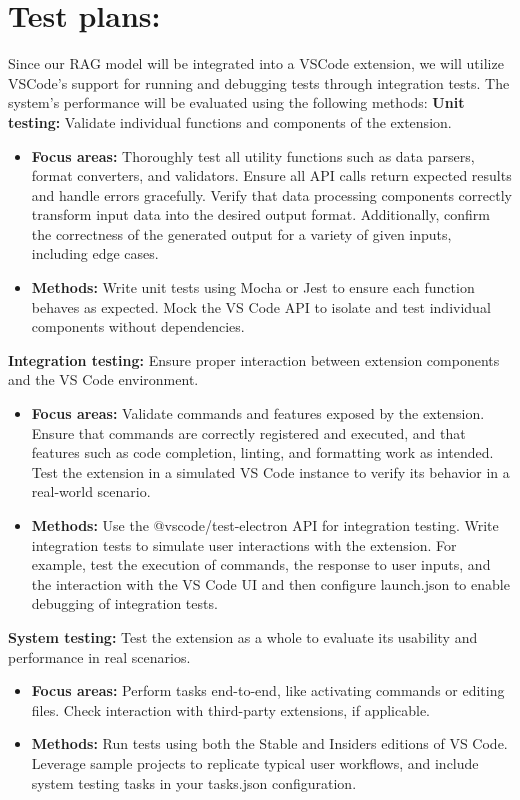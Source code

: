 \section{Test plans:}
Since our RAG model will be integrated into a VSCode extension, we will utilize VSCode's support for running and debugging tests through integration tests. The system's performance will be evaluated using the following methods:
\textbf{Unit testing:} Validate individual functions and components of the extension.
\begin{itemize}
    \item \textbf{Focus areas:} Thoroughly test all utility functions such as data parsers, format converters, and validators. Ensure all API calls return expected results and handle errors gracefully. Verify that data processing components correctly transform input data into the desired output format. Additionally, confirm the correctness of the generated output for a variety of given inputs, including edge cases.
    \item \textbf{Methods:} Write unit tests using Mocha or Jest to ensure each function behaves as expected. Mock the VS Code API to isolate and test individual components without dependencies.
\end{itemize}

\textbf{Integration testing:} Ensure proper interaction between extension components and the VS Code environment.
\begin{itemize}
    \item \textbf{Focus areas:} Validate commands and features exposed by the extension. Ensure that commands are correctly registered and executed, and that features such as code completion, linting, and formatting work as intended. Test the extension in a simulated VS Code instance to verify its behavior in a real-world scenario.
    \item \textbf{Methods:} Use the @vscode/test-electron API for integration testing. Write integration tests to simulate user interactions with the extension. For example, test the execution of commands, the response to user inputs, and the interaction with the VS Code UI and then configure launch.json to enable debugging of integration tests.
\end{itemize}

\textbf{System testing:} Test the extension as a whole to evaluate its usability and performance in real scenarios.
\begin{itemize}
    \item \textbf{Focus areas:} Perform tasks end-to-end, like activating commands or editing files. Check interaction with third-party extensions, if applicable.
    \item \textbf{Methods:} Run tests using both the Stable and Insiders editions of VS Code. Leverage sample projects to replicate typical user workflows, and include system testing tasks in your tasks.json configuration.
\end{itemize}

